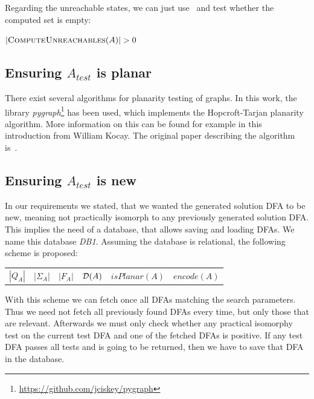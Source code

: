 Regarding the unreachable states, we can just use \CompUnr\ and test whether the computed set is empty:
\vspace{0.2cm}
\begin{algorithmic}[1]
	\State \Return $|\textsc{ComputeUnreachables}(A)| > 0$
	\EndFunction
\end{algorithmic}

\subsection{Ensuring $A_{test}$ is planar}

There exist several algorithms for planarity testing of graphs. In this work, the library \emph{pygraph}\footnote{\url{https://github.com/jciskey/pygraph}} has been used, which implements the Hopcroft-Tarjan planarity algorithm. More information on this can be found for example in this~\cite{kocay93} introduction from William Kocay. The original paper describing the algorithm is~\cite{hopcroft74}.

\subsection{Ensuring $A_{test}$ is new}

In our requirements we stated, that we wanted the generated solution DFA to be new, meaning not practically isomorph to any previously generated solution DFA. This implies the need of a database, that allows saving and loading DFAs. We name this database \emph{DB1}. Assuming the database is relational, the following scheme is proposed:
\begin{center}
	\begin{tabular}{c c c c c c}
	$|Q_A|$ & |$\Sigma_A$| & $|F_A|$ & $\mathcal{D}(A)$ & $isPlanar(A)$ & $encode(A)$
	\end{tabular}
\end{center}
With this scheme we can fetch once all DFAs matching the search parameters. Thus we need not fetch all previously found DFAs every time, but only those that are relevant. Afterwards we must only check whether any practical isomorphy test on the current test DFA and one of the fetched DFAs is positive. If any test DFA passes all tests and is going to be returned, then we have to save that DFA in the database.

